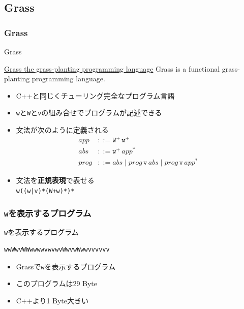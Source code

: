 \documentclass[12pt, unicode, svgnames]{beamer}
\begin{document}
\subsection{Grass}
\begin{frame}[fragile]
  \frametitle{Grass}

  \begin{block}{Grass}
    \begin{shadequote}[r]{\scriptsize\href{http://www.blue.sky.or.jp/grass/}{Grass the grass-planting programming language}}
      Grass is a functional grass-planting programming language.
    \end{shadequote}
  \end{block}

  \begin{itemize}
    \item<2-> C++と同じくチューリング完全なプログラム言語
    \item<3-> \texttt{w}と\texttt{W}と\texttt{v}の組み合せでプログラムが記述できる
    \item<4-> 文法が次のように定義される
      \begin{align*}
        app &::= \mathtt{W}^+\, \mathtt{w}^+ \\
        abs &::= \mathtt{w}^+\, app^* \\
        prog &::= abs \mid prog\, \mathtt{v}\, abs \mid prog\, \mathtt{v}\, app^* 
      \end{align*}
    \item<5-> 文法を\textbf{正規表現}で表せる \\
      \lstinline{w((w|v)*(W+w)*)*}
  \end{itemize}
\end{frame}

\begin{frame}[fragile]
  \frametitle{\texttt{w}を表示するプログラム}

  \begin{exampleblock}{\texttt{w}を表示するプログラム}
\begin{lstlisting}[style=grass]
wwWwvWWwwwwvwvwvWwvwWwwvvvvvv
\end{lstlisting}
  \end{exampleblock}

  \begin{itemize}
    \item<2-> Grassで\texttt{w}を表示するプログラム
    \item<3-> このプログラムは29 Byte
    \item<4-> C++より1 Byte大きい
  \end{itemize}
\end{frame}
\end{document}
